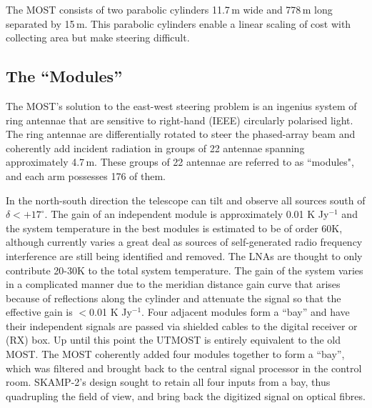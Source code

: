 
The MOST consists of two parabolic cylinders 11.7\,m wide and 778\,m long separated by 15\,m. This parabolic cylinders enable a linear scaling of cost with collecting area but make steering difficult.

\subsection{The ``Modules''}
The MOST's solution to the east-west steering problem is an ingenius system of ring antennae that are sensitive to right-hand (IEEE) circularly polarised light. The ring antennae are differentially rotated to steer the phased-array beam and coherently add incident radiation in groups of 22 antennae spanning approximately 4.7\,m. These groups of 22 antennae are referred to as ``modules", and each arm possesses 176 of them. 

In the north-south direction the telescope can tilt and observe all sources south of $\delta<+17^\circ$. The gain of an independent module is approximately 0.01 K Jy$^{-1}$ and the system temperature in the best modules is estimated to be of order 60K, although currently varies a great deal as sources of self-generated radio frequency interference are still being identified and removed. The LNAs are thought to only contribute 20-30K to the total system temperature. The gain of the system varies in a complicated manner due to the meridian distance gain curve that arises because of reflections along the cylinder and attenuate the signal so that the effective gain is $<$0.01 K Jy$^{-1}$\cite{Hunstead_1996}.
Four adjacent modules form a ``bay'' and have their independent signals are passed via shielded cables to the digital receiver or (RX) box. Up until this point the UTMOST is entirely equivalent to the old MOST. The MOST coherently added four modules together to form a ``bay'', which was filtered and brought back to the central signal processor in the control room. SKAMP-2's design sought to retain all four inputs from a bay, thus quadrupling the field of view, and bring back the digitized signal on optical fibres.
